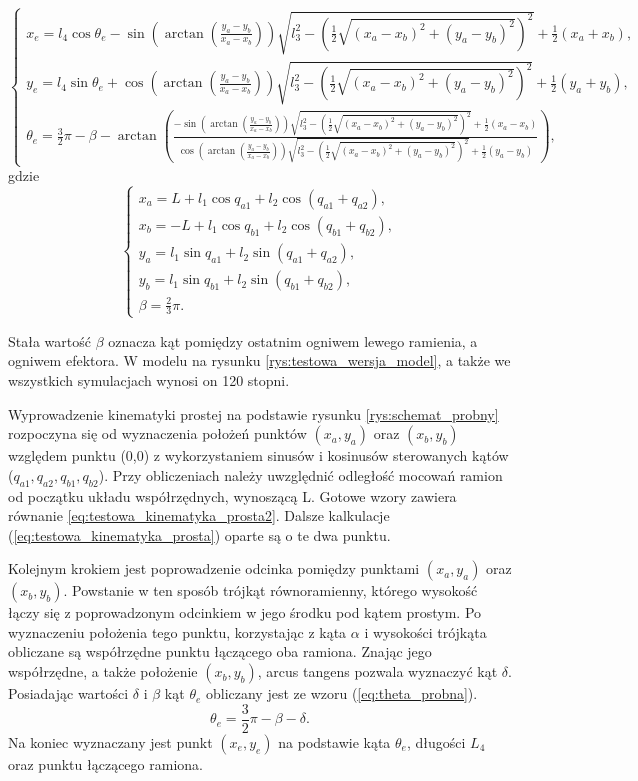 \documentclass[printmode]{mgr}
\begin{document}
\begin{equation}
\begin{cases}
x_e = l_4\cos\theta_e - \sin(\arctan(\frac{y_a-y_b}{x_a-x_b}))\sqrt{l_3^2-(\frac{1}{2}\sqrt{(x_a-x_b)^2+(y_a-y_b)^2})^2} + \frac{1}{2}(x_a+x_b),\\
y_e = l_4\sin\theta_e + \cos(\arctan(\frac{y_a-y_b}{x_a-x_b}))\sqrt{l_3^2-(\frac{1}{2}\sqrt{(x_a-x_b)^2+(y_a-y_b)^2})^2} + \frac{1}{2}(y_a+y_b),\\
\theta_e = \frac{3}{2}\pi - \beta - \arctan(\frac{- \sin(\arctan(\frac{y_a-y_b}{x_a-x_b}))\sqrt{l_3^2-(\frac{1}{2}\sqrt{(x_a-x_b)^2+(y_a-y_b)^2})^2} + \frac{1}{2}(x_a-x_b)}{\cos(\arctan(\frac{y_a-y_b}{x_a-x_b}))\sqrt{l_3^2-(\frac{1}{2}\sqrt{(x_a-x_b)^2+(y_a-y_b)^2})^2} + \frac{1}{2}(y_a-y_b)}) ,
\end{cases}
\label{eq:testowa_kinematyka_prosta}
\end{equation}
gdzie
\begin{equation}
\begin{cases}
x_a = L + l_1\cos q_{a1} + l_2 \cos(q_{a1}+q_{a2}),\\
x_b = -L + l_1\cos q_{b1} + l_2 \cos(q_{b1}+q_{b2}),\\
y_a = l_1\sin q_{a1} + l_2 \sin(q_{a1}+q_{a2}),\\
y_b = l_1\sin q_{b1} + l_2 \sin(q_{b1}+q_{b2}),\\
\beta = \frac{2}{3}\pi.
\end{cases}
\label{eq:testowa_kinematyka_prosta2}
\end{equation}

Stała wartość $\beta$ oznacza kąt pomiędzy ostatnim ogniwem lewego ramienia, a ogniwem efektora. W modelu na rysunku \ref{rys:testowa_wersja_model},
a także we wszystkich symulacjach wynosi on 120 stopni. 

Wyprowadzenie kinematyki prostej na podstawie rysunku \ref{rys:schemat_probny} rozpoczyna się od wyznaczenia położeń punktów
$(x_a, y_a)$ oraz $(x_b, y_b)$ względem punktu (0,0) z wykorzystaniem sinusów i kosinusów sterowanych kątów ($q_{a1}, q_{a2}, q_{b1}, q_{b2}$).
Przy obliczeniach należy uwzględnić odległość mocowań ramion od początku układu współrzędnych, wynoszącą L. 
Gotowe wzory zawiera równanie \ref{eq:testowa_kinematyka_prosta2}. Dalsze kalkulacje (\ref{eq:testowa_kinematyka_prosta})
oparte są o te dwa punktu. 

Kolejnym krokiem jest poprowadzenie odcinka pomiędzy punktami $(x_a, y_a)$ oraz $(x_b, y_b)$. Powstanie w ten sposób
trójkąt równoramienny, którego wysokość łączy się z poprowadzonym odcinkiem w jego środku pod kątem prostym.
Po wyznaczeniu położenia tego punktu, korzystając z kąta $\alpha$ i wysokości trójkąta obliczane są współrzędne punktu łączącego oba ramiona.
Znając jego współrzędne, a także położenie $(x_b, y_b)$, arcus tangens pozwala wyznaczyć kąt $\delta$. 
Posiadając wartości $\delta$ i $\beta$ kąt $\theta_e$ obliczany jest ze wzoru (\ref{eq:theta_probna}).
\begin{equation}
\theta_e = \frac{3}{2}\pi-\beta-\delta.
\label{eq:theta_probna}
\end{equation}
Na koniec wyznaczany jest punkt $(x_e, y_e)$ na podstawie kąta $\theta_e$, długości $L_4$ oraz punktu łączącego ramiona.
\end{document}
